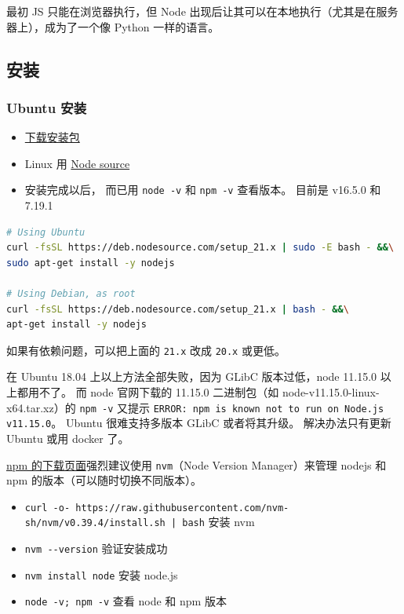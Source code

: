 

最初 JS 只能在浏览器执行，但 Node 出现后让其可以在本地执行（尤其是在服务器上），成为了一个像 Python 一样的语言。

\subsection{安装}
\subsubsection{Ubuntu 安装}
\begin{itemize}
\item \href{https://nodejs.org/en/download/package-manager/}{下载安装包}
\item Linux 用 \href{https://github.com/nodesource/distributions/blob/master/README.md#installation-instructions}{Node source}
\item 安装完成以后， 而已用 \verb`node -v` 和 \verb`npm -v` 查看版本。 目前是 v16.5.0 和 7.19.1
\end{itemize}
\begin{lstlisting}[language=bash]
# Using Ubuntu
curl -fsSL https://deb.nodesource.com/setup_21.x | sudo -E bash - &&\
sudo apt-get install -y nodejs

# Using Debian, as root
curl -fsSL https://deb.nodesource.com/setup_21.x | bash - &&\
apt-get install -y nodejs
\end{lstlisting}
如果有依赖问题，可以把上面的 \verb`21.x` 改成 \verb`20.x` 或更低。

在 Ubuntu 18.04 上以上方法全部失败，因为 GLibC 版本过低，node 11.15.0 以上都用不了。 而 node 官网下载的 11.15.0 二进制包（如 node-v11.15.0-linux-x64.tar.xz）的 \verb`npm -v` 又提示 \verb`ERROR: npm is known not to run on Node.js v11.15.0`。 Ubuntu 很难支持多版本 GLibC 或者将其升级。 解决办法只有更新 Ubuntu 或用 docker 了。

\href{https://docs.npmjs.com/downloading-and-installing-node-js-and-npm}{npm 的下载页面}强烈建议使用 \verb`nvm`（Node Version Manager）来管理 nodejs 和 npm 的版本（可以随时切换不同版本）。
\begin{itemize}
\item \verb`curl -o- https://raw.githubusercontent.com/nvm-sh/nvm/v0.39.4/install.sh | bash` 安装 nvm
\item \verb`nvm --version` 验证安装成功
\item \verb`nvm install node` 安装 node.js
\item \verb`node -v; npm -v` 查看 node 和 npm 版本
\end{itemize}

